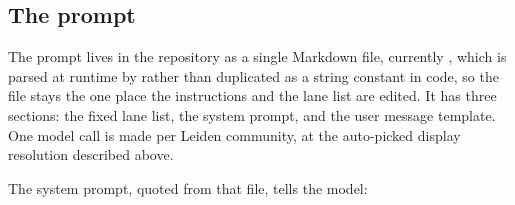 \documentclass[11pt]{article}
\begin{document}
\subsection{The prompt}

The prompt lives in the repository as a single Markdown file, currently
, which is parsed at runtime
by  rather than duplicated as a string
constant in code, so the file stays the one place the instructions and
the lane list are edited. It has three sections: the fixed lane list, the
system prompt, and the user message template. One model call is made per
Leiden community, at the auto-picked display resolution described above.

The system prompt, quoted from that file, tells the model:
\end{document}
